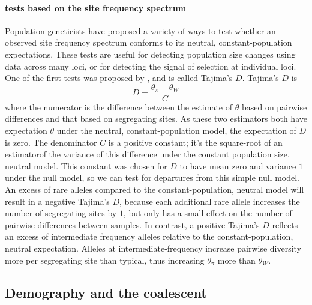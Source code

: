 \paragraph{tests based on the site frequency spectrum}
Population geneticists have proposed a variety of ways to test whether an observed site frequency spectrum conforms to its
neutral, constant-population expectations. These tests are
useful for detecting population size changes using data across many loci, or
for detecting the signal of selection at individual loci. One of
the first tests was proposed by \citeauthor{tajima:89}, and is called
Tajima's $D$. Tajima's $D$ is
\begin{equation}
  D = \frac{\theta_{\pi}-\theta_{W}}{C} \label{eqn_Tajimas_D}
\end{equation}
where the numerator is the difference between the estimate of
$\theta$ based on pairwise differences and that based on segregating
sites. As these two estimators both have expectation $\theta$ under
the neutral, constant-population model, the expectation of $D$ is zero. The denominator $C$ is a positive constant; it's the square-root of an estimatorof the variance of this difference under the constant population size, neutral model. This constant was chosen for $D$ to have mean zero and variance $1$ under the null model, so we can test for  departures from this simple null model.\\

An excess of rare alleles compared to the constant-population, neutral
model will result in a negative Tajima's $D$, because each
additional rare allele increases the number of segregating sites by
$1$, but only has a small effect on the number of pairwise differences between samples. 
In contrast, a positive Tajima's $D$ reflects an excess of intermediate frequency alleles relative to the constant-population, neutral expectation. Alleles at intermediate-frequency increase pairwise diversity
more per segregating site than typical, thus increasing $\theta_{\pi}$ more than $\theta_{W}$.

\subsection{Demography and the coalescent}

